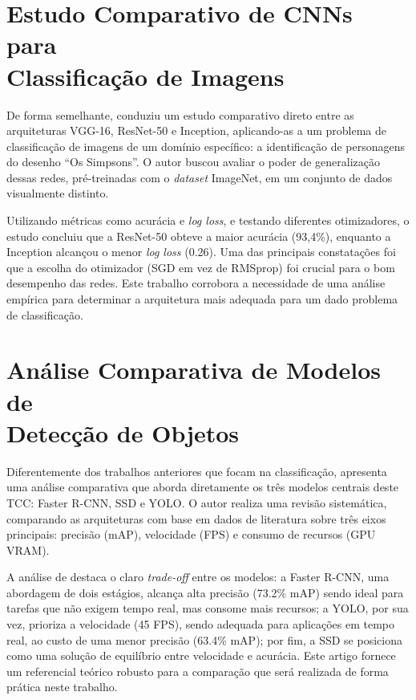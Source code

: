 \section[Estudo Comparativo de CNNs para Classificação de Imagens]{Estudo Comparativo de CNNs para\\Classificação de Imagens}

De forma semelhante,  conduziu um estudo comparativo direto entre as
arquiteturas VGG-16, ResNet-50 e Inception, aplicando-as a um problema de classificação de
imagens de um domínio específico: a identificação de personagens do desenho ``Os Simpsons''.
O autor buscou avaliar o poder de generalização dessas redes, pré-treinadas com o
\textit{dataset} ImageNet, em um conjunto de dados visualmente distinto.

Utilizando métricas como acurácia e \textit{log loss}, e testando diferentes otimizadores, o
estudo concluiu que a ResNet-50 obteve a maior acurácia (93,4\%), enquanto a Inception
alcançou o menor \textit{log loss} (0.26). Uma das principais constatações foi que a escolha
do otimizador (SGD em vez de RMSprop) foi crucial para o bom desempenho das redes. Este
trabalho corrobora a necessidade de uma análise empírica para determinar a arquitetura mais
adequada para um dado problema de classificação.

\section[Análise Comparativa de Modelos de Detecção de Objetos]{Análise Comparativa de Modelos de\\Detecção de Objetos}

Diferentemente dos trabalhos anteriores que focam na classificação,
 apresenta uma análise comparativa que aborda diretamente os três
modelos centrais deste TCC: Faster R-CNN, SSD e YOLO. O autor realiza uma revisão sistemática,
comparando as arquiteturas com base em dados de literatura sobre três eixos principais:
precisão (mAP), velocidade (FPS) e consumo de recursos (GPU VRAM).

A análise de  destaca o claro \textit{trade-off} entre os modelos: a
Faster R-CNN, uma abordagem de dois estágios, alcança alta precisão (73.2\% mAP) sendo ideal
para tarefas que não exigem tempo real, mas consome mais recursos; a YOLO, por sua vez,
prioriza a velocidade (45 FPS), sendo adequada para aplicações em tempo real, ao custo de uma
menor precisão (63.4\% mAP); por fim, a SSD se posiciona como uma solução de equilíbrio entre
velocidade e acurácia. Este artigo fornece um referencial teórico robusto para a comparação
que será realizada de forma prática neste trabalho.

